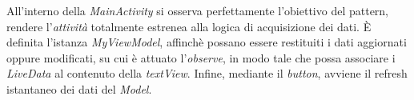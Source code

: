 \documentclass{article}
\begin{document}
All'interno della \textit{MainActivity} si osserva perfettamente l'obiettivo del pattern, rendere l'\textit{attività} totalmente estrenea alla logica di acquisizione dei dati. È definita l'istanza \textit{MyViewModel}, affinchè possano essere restituiti i dati aggiornati oppure modificati, su cui è attuato l'\textit{observe}, in modo tale che possa associare i \textit{LiveData} al contenuto della \textit{textView}. Infine, mediante il \textit{button}, avviene il refresh istantaneo dei dati del \textit{Model}.
\end{document}
